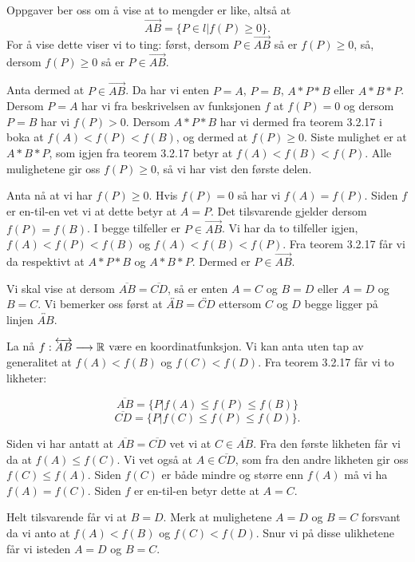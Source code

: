 \begin{oppgave}[3.2.15]
  Oppgaver ber oss om å vise at to mengder er like, altså at 
  $$\overrightarrow{AB} = \{P\in l | f(P)\geq 0\}.$$
  For å vise dette viser vi to ting: først, dersom $P\in \overrightarrow{AB}$ så er $f(P)\geq 0$,
  så, dersom $f(P)\geq 0$ så er $P\in \overrightarrow{AB}$. 
    
  Anta dermed at $P\in \overrightarrow{AB}$. Da har vi enten $P=A$, $P=B$, $A\ast P\ast B$ eller
  $A\ast B\ast P$. Dersom $P=A$ har vi fra beskrivelsen av funksjonen $f$ at $f(P)=0$ og dersom 
  $P=B$ har vi $f(P)>0$. Dersom $A\ast P\ast B$ har vi dermed fra teorem 3.2.17 i boka at 
  $f(A)< f(P)<f(B)$, og dermed at $f(P)\geq 0$. Siste mulighet er at $A\ast B\ast P$, som igjen 
  fra teorem 3.2.17 betyr at $f(A)<f(B)<f(P)$. Alle mulighetene gir oss $f(P)\geq 0$, så vi har 
  vist den første delen. 

  Anta nå at vi har $f(P)\geq 0$. Hvis $f(P)=0$ så har vi $f(A)=f(P)$. Siden $f$ er en-til-en vet 
  vi at dette betyr at $A=P$. Det tilsvarende gjelder dersom $f(P)=f(B)$. I begge tilfeller er
  $P\in \overrightarrow{AB}$. Vi har da to tilfeller igjen, $f(A)<f(P)<f(B)$ og $f(A)<f(B)<f(P)$. 
  Fra teorem 3.2.17 får vi da respektivt at $A\ast P\ast B$ og $A\ast B\ast P$. Dermed er 
  $P\in \overrightarrow{AB}$. 
\end{oppgave}

\begin{oppgave}[3.2.22]
  Vi skal vise at dersom $\overline{AB} = \overline{CD}$, så er enten $A=C$ og $B=D$ eller $A=D$
  og $B=C$. Vi bemerker oss først at $\overleftrightarrow{AB} = \overleftrightarrow{CD}$ ettersom 
  $C$ og $D$ begge ligger på linjen $\overleftrightarrow{AB}$. 

  La nå $f:\overleftrightarrow{AB}\longrightarrow \mathbb{R}$ være en koordinatfunksjon. Vi kan anta uten 
  tap av generalitet at $f(A)<f(B)$ og $f(C)<f(D)$. Fra teorem 3.2.17 får vi to likheter:
    
  $$ \overline{AB}=\{ P|f(A)\leq f(P)\leq f(B) \} $$
  $$ \overline{CD}=\{ P|f(C)\leq f(P)\leq f(D) \} .$$
    
  Siden vi har antatt at $\overline{AB}=\overline{CD}$ vet vi at $C\in \overline{AB}$. Fra den 
  første likheten får vi da at $f(A)\leq f(C)$. Vi vet også at $A\in \overline{CD}$, som fra den 
  andre likheten gir oss $f(C)\leq f(A)$. Siden $f(C)$ er både mindre og større enn $f(A)$ må vi 
  ha $f(A)=f(C)$. Siden $f$ er en-til-en betyr dette at $A=C$. 

  Helt tilsvarende får vi at $B=D$. Merk at mulighetene $A=D$ og $B=C$ forsvant da vi anto at 
  $f(A)<f(B)$ og $f(C)<f(D)$. Snur vi på disse ulikhetene får vi isteden $A=D$ og $B=C$. 
\end{oppgave}

